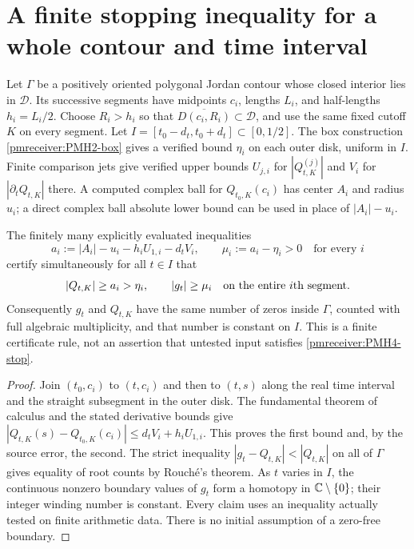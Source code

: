 \documentclass[11pt]{article}
\begin{document}
\section{A finite stopping inequality for a whole contour and time interval}

Let $\Gamma$ be a positively oriented polygonal Jordan contour
whose closed interior lies in $\mathcal D$. Its successive segments
have midpoints $c_i$, lengths $L_i$, and half-lengths $h_i=L_i/2$.
Choose $R_i>h_i$ so that
$\overline{D(c_i,R_i)}\subset\mathcal D$, and use the same fixed
cutoff $K$ on every segment. Let $I=[t_0-d_t,t_0+d_t]\subset[0,1/2]$.
The box construction \eqref{pmreceiver:PMH2-box} gives a verified bound $\eta_i$
on each outer disk, uniform in $I$. Finite comparison jets give
verified upper bounds $U_{j,i}$ for $|Q_{t,K}^{(j)}|$ and $V_i$ for
$|\partial_tQ_{t,K}|$ there. A computed complex ball for
$Q_{t_0,K}(c_i)$ has center $A_i$ and radius $u_i$; a direct complex
ball absolute lower bound can be used in place of $|A_i|-u_i$.

\begin{pmreceivertheorem}
\label{pmreceiver:PMH4}
The finitely many explicitly evaluated inequalities
\begin{equation}\label{pmreceiver:PMH4-stop}
 a_i:=|A_i|-u_i-h_iU_{1,i}-d_tV_i,\qquad
 \mu_i:=a_i-\eta_i>0\quad\text{for every }i
\end{equation}
certify simultaneously for all $t\in I$ that
\[
 |Q_{t,K}|\ge a_i>\eta_i,\qquad |g_t|\ge\mu_i
 \quad\hbox{on the entire $i$th segment.}
\]
Consequently $g_t$ and $Q_{t,K}$ have the same number of zeros
inside $\Gamma$, counted with full algebraic multiplicity, and that
number is constant on $I$. This is a finite certificate rule, not an
assertion that untested input satisfies \eqref{pmreceiver:PMH4-stop}.
\end{pmreceivertheorem}
\begin{proof}
Join $(t_0,c_i)$ to $(t,c_i)$ and then to $(t,s)$ along the real time
interval and the straight subsegment in the outer disk. The
fundamental theorem of calculus and the stated derivative bounds
give
$|Q_{t,K}(s)-Q_{t_0,K}(c_i)|\le d_tV_i+h_iU_{1,i}$.
This proves the first bound and, by the source error, the second.
The strict inequality $|g_t-Q_{t,K}|<|Q_{t,K}|$ on all of $\Gamma$
gives equality of root counts by Rouch\'e's theorem. As $t$ varies in
$I$, the continuous nonzero boundary values of $g_t$ form a homotopy
in $\mathbb C\setminus\{0\}$; their integer winding number is constant.
Every claim uses an inequality actually tested on finite arithmetic
data. There is no initial assumption of a zero-free boundary.
\end{proof}
\end{document}
